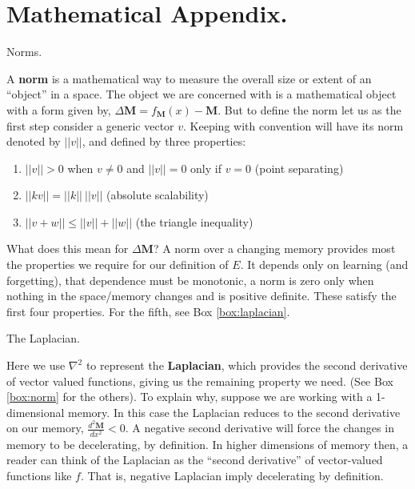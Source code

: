 \section*{Mathematical Appendix.}
\newcommand{\beginsupplement}{%
        \setcounter{table}{0}
        \renewcommand{\thetable}{S\arabic{table}}%
        \setcounter{figure}{0}
        \renewcommand{\thefigure}{S\arabic{figure}}%
     }
\beginsupplement
\setcounter{theorem}{0}

\begin{featurebox}
	\caption{Norms.}
	\label{box:norm}
	A \textbf{norm} is a mathematical way to measure the overall size or extent of an ``object'' in a space. The object we are concerned with is a mathematical object with a form given by, $\Delta \mathbf{M} = f_{\mathbf{M}}(x) - \mathbf{M}$. But to define the norm let us as the first step consider a generic vector $v$. Keeping with convention will have its norm denoted by $||v||$, and defined by three properties:
	
	\begin{enumerate}
	  \item $||v|| > 0$ when $v \neq 0$ and $||v|| = 0$ only if $v=0$ (point separating)
	  \item $||k v|| = ||k||\ ||v||$ (absolute scalability)
	  \item $||v + w|| \leq ||v|| + ||w||$ (the triangle inequality)
	\end{enumerate}
	
	What does this mean for $\Delta \mathbf{M}$? A norm over a changing memory provides most the properties we require for our definition of $E$. It depends only on learning (and forgetting), that dependence must be monotonic, a norm is zero only when nothing in the space/memory changes and is positive definite. These satisfy the first four properties. For the fifth, see Box \ref{box:laplacian}.
	\medskip
	\end{featurebox}
	
	\begin{featurebox}
		\caption{The Laplacian.}
		\label{box:laplacian}
		Here we use $\nabla^2$ to represent the \textbf{Laplacian}, which provides the second derivative of vector valued functions, giving us the remaining property we need. (See Box \ref{box:norm} for the others). To explain why, suppose we are working with a 1- dimensional memory. In this case the Laplacian reduces to the second derivative on our memory, $\frac{d^2\mathbf{M}}{dx^2} < 0$. A negative second derivative will force the changes in memory to be decelerating, by definition. In higher dimensions of memory then, a reader can think of the Laplacian as the ``second derivative'' of vector-valued functions like $f$. That is, negative Laplacian imply decelerating by definition.
		\medskip
	\end{featurebox}

